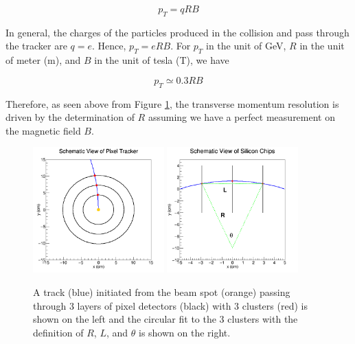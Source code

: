 \begin{equation}
p_T  = qRB
\end{equation}

In general, the charges of the particles produced in the collision and pass through the tracker are $q = e$. Hence, $p_T = eRB$. For $p_T$ in the unit of GeV, $R$ in the unit of meter (m), and $B$ in the unit of tesla (T), we have 

\begin{equation}
p_T  \simeq 0.3 RB
\end{equation}

Therefore, as seen above from Figure \ref{HelixAndFit}, the transverse momentum resolution is driven by the determination of $R$ assuming we have a perfect measurement on the magnetic field $B$.

\begin{figure}[hbtp]
\begin{center}
\includegraphics[width=0.45\textwidth]{Figures/Chapter3/PixLayTrk.png}
\includegraphics[width=0.45\textwidth]{Figures/Chapter3/FitOnHits.png}
\caption{A track (blue) initiated from the beam spot (orange) passing through 3 layers of pixel detectors (black) with 3 clusters (red) is shown on the left and the circular fit to the 3 clusters with the definition of $R$, $L$, and $\theta$ is shown on the right.}
\label{HelixAndFit}
\end{center}
\end{figure} 



